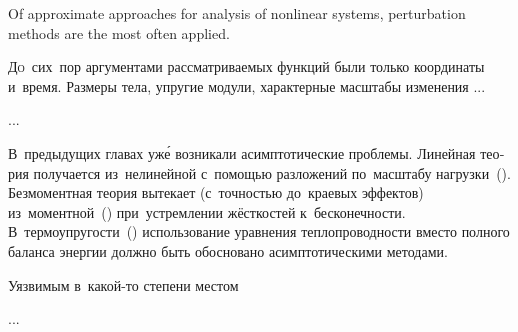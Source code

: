 

\thispagestyle{empty}

\label{chapter:asymptoticperturbationmethods}

{\small
Of approximate approaches for analysis of nonlinear systems, perturbation methods are the most often applied.
\par}



\begin{otherlanguage}{russian}

\lettrine[lines=2, findent=2pt, nindent=0pt]{Д}{о}~сих~пор аргументами рассматриваемых функций были только координаты и~время. Размеры тела, упругие модули, характерные масштабы изменения ...

...


В~предыдущих главах уж\'{е} возникали асимптотические проблемы. Линейная теория получается из~нелинейной с~помощью разложений по~масштабу нагрузки~(). Безмоментная теория вытекает (с~точностью до~краевых эффектов) из~моментной~() при~устремлении  жёсткостей к~бесконечности. В~термо\-упругости~() использование уравнения теплопроводности вместо полного баланса энергии должно быть обосновано асимпто\-ти\-чес\-кими методами.

Уязвимым в~какой\hbox{-}то степени местом


...



\end{otherlanguage}

